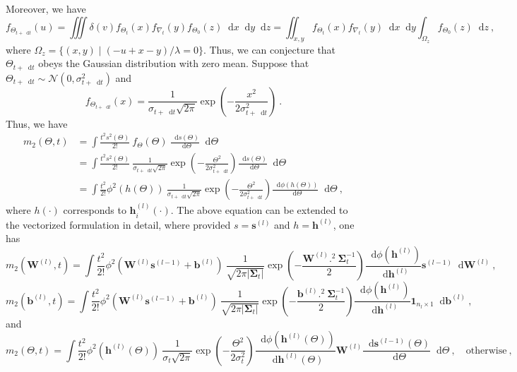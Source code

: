 \documentclass[review,10pt]{JMtemplate}
\newcommand*{\dif}{\mathop{}\!\mathrm{d}}
\begin{document}
Moreover, we have
\[
f_{\Theta_{t+\dif t}}( u ) = \iiint \delta(  v  ) f_{\Theta_t}(x) f_{\nabla_t}(y)  f_{\Theta_0} (z) \dif x\! \dif y\! \dif z 
= \iint_{x,y}  f_{\Theta_t}(x) f_{\nabla_t}(y) \dif x\! \dif y  \int_{\Omega_z} f_{\Theta_0} (z) \dif z \ ,
\]
where $\Omega_z = \{ (x,y) \mid (-u+x-y)/ \lambda = 0 \}$. Thus, we can conjecture that $\Theta_{t+\dif t}$ obeys the Gaussian distribution with zero mean. Suppose that $\Theta_{t+\dif t} \sim \mathcal{N}(0, \sigma_{t+\dif t}^2) $ and
\[
f_{\Theta_{t+\dif t}}(x) = \frac{1}{\sigma_{t+\dif t} \sqrt{2\pi}} \exp \left( -\frac{x^2}{2\sigma_{t+\dif t}^2} \right) \ .
\]
Thus, we have
\[
\begin{aligned}
    m_2 (\Theta,t) &= \int \frac{t^2 s^2(\Theta)}{2!}  ~f_{\Theta}(\Theta) ~\frac{\dif s(\Theta)}{\dif \Theta} \dif \Theta \\
    &= \int \frac{t^2 s^2(\Theta)}{2!} ~\frac{1}{\sigma_{t+\dif t} \sqrt{2\pi}} \exp \left( -\frac{\Theta^2}{2\sigma_{t+\dif t}^2} \right) \frac{\dif s(\Theta)}{\dif \Theta} \dif \Theta \\
    &= \int \frac{t^2 }{2!} \phi^2(h(\Theta)) ~\frac{1}{\sigma_{t+\dif t} \sqrt{2\pi}} \exp \left( -\frac{\Theta^2}{2\sigma_{t+\dif t}^2} \right) \frac{\dif \phi(h(\Theta))}{\dif \Theta} \dif \Theta  \ ,
\end{aligned}
\]
where $h(\cdot)$ corresponds to $\boldsymbol{h}_i^{(l)}(\cdot)$. The above equation can be extended to the vectorized formulation in detail, where provided $s=\boldsymbol{s}^{(l)}$ and $h=\boldsymbol{h}^{(l)}$, one has
\[
m_2 \left( \mathbf{W}^{(l)},t \right) = \int \frac{t^2 }{2!} \phi^2 \left(\mathbf{W}^{(l)} \boldsymbol{s}^{(l-1)} + \boldsymbol{b}^{(l)} \right) ~\frac{1}{\sqrt{2\pi |\mathbf{\Sigma}_t|} } \exp \left( -\frac{ \mathbf{W}^{(l)}.^2 ~\mathbf{\Sigma}_t^{-1}}{2} \right) \frac{\dif \phi ( \boldsymbol{h}^{(l)} )}{\dif \boldsymbol{h}^{(l)} }  \boldsymbol{s}^{(l-1)}  \dif \mathbf{W}^{(l)} \ ,
\]
\[
m_2 \left( \boldsymbol{b}^{(l)},t \right) = \int \frac{t^2 }{2!} \phi^2 \left(\mathbf{W}^{(l)} \boldsymbol{s}^{(l-1)} + \boldsymbol{b}^{(l)} \right) ~\frac{1}{\sqrt{2\pi |\mathbf{\Sigma}_t|} } \exp \left( -\frac{ \boldsymbol{b}^{(l)}.^2 ~\mathbf{\Sigma}_t^{-1}}{2} \right) \frac{\dif \phi ( \boldsymbol{h}^{(l)} )}{\dif \boldsymbol{h}^{(l)} }  \boldsymbol{1}_{n_l \times 1}  \dif \boldsymbol{b}^{(l)} \ ,
\]
and
\[
m_2 \left( \Theta,t \right) = \int \frac{t^2 }{2!} \phi^2 \left( \boldsymbol{h}^{(l)} (\Theta) \right) ~\frac{1}{\sigma_t \sqrt{2\pi}} \exp \left( -\frac{\Theta^2}{2\sigma_t^2} \right) \frac{\dif \phi ( \boldsymbol{h}^{(l)}(\Theta) )}{\dif \boldsymbol{h}^{(l)}(\Theta) }  \mathbf{W}^{(l)} \frac{\dif \boldsymbol{s}^{(l-1)}(\Theta) }{\dif \Theta} \dif \Theta \ , \quad \textrm{otherwise} \ ,
\]
\end{document}
